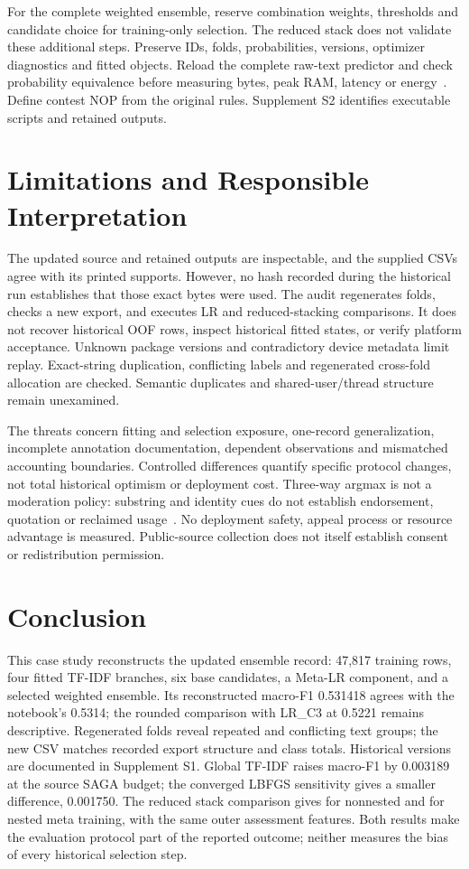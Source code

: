 \documentclass[doublecolumn]{ijcvsplatex}
\begin{document}
For the complete weighted ensemble, reserve combination weights, thresholds and candidate choice for training-only selection. The reduced stack does not validate these additional steps. Preserve IDs, folds, probabilities, versions, optimizer diagnostics and fitted objects. Reload the complete raw-text predictor and check probability equivalence before measuring bytes, peak RAM, latency or energy~\cite{pineau2021reproducibility}. Define contest NOP from the original rules. Supplement S2 identifies executable scripts and retained outputs.

\section{Limitations and Responsible Interpretation}
\label{sec:limitations}
The updated source and retained outputs are inspectable, and the supplied CSVs agree with its printed supports. However, no hash recorded during the historical run establishes that those exact bytes were used. The audit regenerates folds, checks a new export, and executes LR and reduced-stacking comparisons. It does not recover historical OOF rows, inspect historical fitted states, or verify platform acceptance. Unknown package versions and contradictory device metadata limit replay. Exact-string duplication, conflicting labels and regenerated cross-fold allocation are checked. Semantic duplicates and shared-user/thread structure remain unexamined.

The threats concern fitting and selection exposure, one-record generalization, incomplete annotation documentation, dependent observations and mismatched accounting boundaries. Controlled differences quantify specific protocol changes, not total historical optimism or deployment cost. Three-way argmax is not a moderation policy: substring and identity cues do not establish endorsement, quotation or reclaimed usage~\cite{blodgett2020language,rottger2021hatecheck}. No deployment safety, appeal process or resource advantage is measured. Public-source collection does not itself establish consent or redistribution permission.

\section{Conclusion}
\label{sec:conclusion}
This case study reconstructs the updated ensemble record: 47,817 training rows, four fitted TF-IDF branches, six base candidates, a Meta-LR component, and a selected weighted ensemble. Its reconstructed macro-F1 0.531418 agrees with the notebook's 0.5314; the rounded comparison with LR\_C3 at 0.5221 remains descriptive. Regenerated folds reveal repeated and conflicting text groups; the new CSV matches recorded export structure and class totals. Historical versions are documented in Supplement S1. Global TF-IDF raises macro-F1 by 0.003189 at the source SAGA budget; the converged LBFGS sensitivity gives a smaller difference, 0.001750. The reduced stack comparison gives \NonNested{} for nonnested and \Nested{} for nested meta training, with the same outer assessment features. Both results make the evaluation protocol part of the reported outcome; neither measures the bias of every historical selection step.
\end{document}
